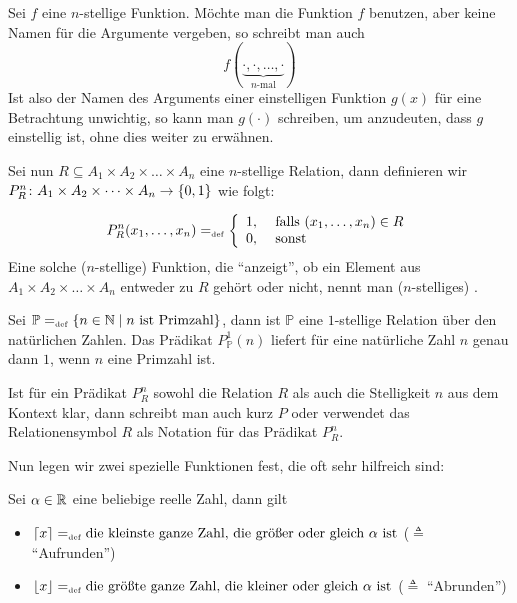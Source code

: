 \begin{definition}
Sei $f$ eine $n$-stellige Funktion. Möchte man die Funktion $f$
benutzen, aber keine Namen für die Argumente vergeben, so
schreibt man auch 
\begin{displaymath}
f(\underbrace{\cdot, \cdot, \ldots , \cdot}_{\text{$n$-mal}})
\end{displaymath}
Ist also der Namen des Arguments einer einstelligen Funktion $g(x)$
für eine Betrachtung unwichtig, so kann man
$g(\cdot)$  schreiben, um anzudeuten, dass $g$
einstellig ist, ohne dies weiter zu erwähnen.
\end{definition}

Sei nun $R \subseteq A_1 \times A_2 \times \dots \times A_n$ eine
$n$-stellige Relation, dann definieren wir $P^n_R \colon A_1 \times
A_2 \times \dots \times A_n \rightarrow \{0,1\}$ wie folgt:

\begin{displaymath}
P^n_R({x_{1}}, \allowbreak \dots , \allowbreak{x_{n}}) =_{\mathrm{\scriptscriptstyle def}} 
\left\{
\begin{array}{rl}
1,& \text{ falls $({x_{1}}, \allowbreak \dots , \allowbreak{x_{n}}) \in R$}\\
0,& \text{ sonst} 
\end{array}
\right.
\end{displaymath}
Eine solche ($n$-stellige) Funktion, die "`anzeigt"', ob ein Element 
aus $A_1 \times A_2 \times \dots \times A_n$ entweder zu $R$ gehört 
oder nicht, nennt man ($n$-stelliges) .

\begin{example}
Sei $\mathbb{P} =_{\mathrm{\scriptscriptstyle def}} \{n \in \mathbb N \mid \text{$n$ ist Primzahl}\}$, dann
ist $\mathbb{P}$ eine $1$-stellige Relation über den natürlichen Zahlen. 
Das Prädikat $P^1_{\mathbb{P}}(n)$ liefert für eine natürliche Zahl
$n$ genau dann $1$, wenn $n$ eine Primzahl ist.
\end{example}

Ist für ein Prädikat $P^n_R$ sowohl die Relation $R$ als auch die
Stelligkeit $n$ aus dem Kontext klar, dann schreibt man auch kurz $P$
oder verwendet das Relationensymbol $R$ als Notation für das Prädikat
$P^n_R$. 

\bigskip

\noindent Nun legen wir zwei spezielle Funktionen fest, die oft sehr
hilfreich sind:
\begin{definition}
\label{floorceil}
Sei $\alpha \in \mathbb R$ eine beliebige reelle Zahl, dann gilt
\begin{itemize}
%
\item $\lceil x \rceil =_{\mathrm{\scriptscriptstyle def}} \text{die kleinste ganze Zahl, die größer
oder gleich $\alpha$ ist}$ ($\triangleq$ "`Aufrunden"') \index{$\lceil \cdot \rceil$}
%
\item $\lfloor x \rfloor =_{\mathrm{\scriptscriptstyle def}} \text{die größte ganze Zahl, die kleiner
oder gleich $\alpha$ ist}$ ($\triangleq$ "`Abrunden"') \index{$\lfloor \cdot \rfloor$}
%
\end{itemize}
\end{definition}

